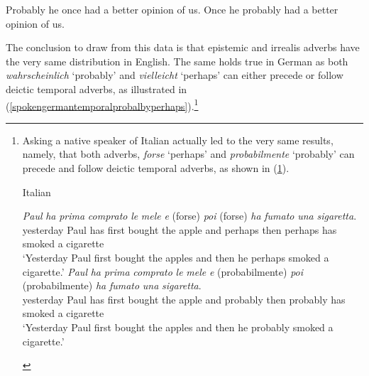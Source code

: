 \begin{exe}
\ex\label{cinuqeenglishdatairrealiscc}\begin{xlist}
\ex Probably he once had a better opinion of us.
\ex Once he probably had a better opinion of us.
\end{xlist}
\end{exe}

\noindent The conclusion to draw from this data is that epistemic and irrealis adverbs have the very same distribution in English. The same holds true in German as both \textit{wahrscheinlich} `probably' and \textit{vielleicht} `perhaps' can either precede or follow deictic temporal adverbs, as illustrated in (\ref{spokengermantemporalprobalbyperhaps}).\footnote{ Asking a native speaker of Italian actually led to the very same results, namely, that both adverbs, \textit{forse} `perhaps' and \textit{probabilmente} `probably' can precede and follow deictic temporal adverbs, as shown in (\ref{italianforseperhaps}).

\begin{exe}
\ex Italian \label{italianforseperhaps}\begin{xlist} 
\ex {} {\textit{Paul}} {\textit{ha}} {\textit{prima}} {\textit{comprato}} {\textit{le}} {\textit{mele}} {\textit{e}} {(forse)} {\textit{poi}} {(forse)} {\textit{ha}} {\textit{fumato}} {\textit{una}} {\textit{sigaretta}}.\\
{yesterday} {Paul} {has} {first} {bought} {the} {apple} {and} {perhaps} {then} {perhaps} {has} {smoked} {a} {cigarette}\\ 
\trans `Yesterday Paul first bought the apples and then he perhaps smoked a cigarette.' \label{italianforseperhapsa}
\ex {} {\textit{Paul}} {\textit{ha}} {\textit{prima}} {\textit{comprato}} {\textit{le}} {\textit{mele}} {\textit{e}} {(probabilmente)} {\textit{poi}} {(probabilmente)} {\textit{ha}} {\textit{fumato}} {\textit{una}} {\textit{sigaretta}}.\\
{yesterday} {Paul} {has} {first} {bought} {the} {apple} {and} {probably} {then} {probably} {has} {smoked} {a} {cigarette}\\ 
\trans `Yesterday Paul first bought the apples and then he probably smoked a cigarette.' \label{italianforseperhapsa}

\end{xlist}
\end{exe}

}

